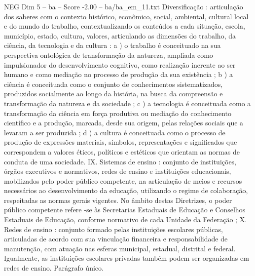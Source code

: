 \begin{textsample}{NEG Dim 5 – ba – Score -2.00 – ba/ba\_em\_11.txt}
Diversificação : articulação dos saberes com o contexto histórico, econômico, social, ambiental, cultural local e do mundo do trabalho, contextualizando os conteúdos a cada situação, escola, município, estado, cultura, valores, articulando as dimensões do trabalho, da ciência, da tecnologia e da cultura : a ) o trabalho é conceituado na sua perspectiva ontológica de transformação da natureza, ampliada como impulsionador do desenvolvimento cognitivo, como realização inerente ao ser humano e como mediação no processo de produção da sua existência ; b ) a ciência é conceituada como o conjunto de conhecimentos sistematizados, produzidos socialmente ao longo da história, na busca da compreensão e transformação da natureza e da sociedade ; c ) a tecnologia é conceituada como a transformação da ciência em força produtiva ou mediação do conhecimento científico e a produção, marcada, desde sua origem, pelas relações sociais que a levaram a ser produzida ; d ) a cultura é conceituada como o processo de produção de expressões materiais, símbolos, representações e significados que correspondem a valores éticos, políticos e estéticos que orientam as normas de conduta de uma sociedade.
IX.
Sistemas de ensino : conjunto de instituições, órgãos executivos e normativos, redes de ensino e instituições educacionais, mobilizados pelo poder público competente, na articulação de meios e recursos necessários ao desenvolvimento da educação, utilizando o regime de colaboração, respeitadas as normas gerais vigentes.
No âmbito destas Diretrizes, o poder público competente refere -se às Secretarias Estaduais de Educação e Conselhos Estaduais de Educação, conforme normativo de cada Unidade da Federação ; X.
Redes de ensino : conjunto formado pelas instituições escolares públicas, articuladas de acordo com sua vinculação financeira e responsabilidade de manutenção, com atuação nas esferas municipal, estadual, distrital e federal.
Igualmente, as instituições escolares privadas também podem ser organizadas em redes de ensino.
Parágrafo único.

\end{textsample}
